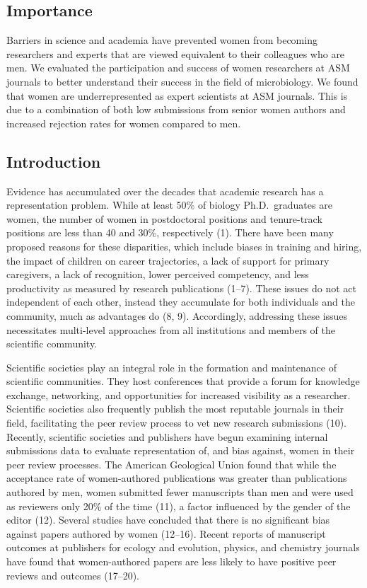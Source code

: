\documentclass[11pt,]{article}
\begin{document}
\subsection{Importance}\label{importance}

Barriers in science and academia have prevented women from becoming
researchers and experts that are viewed equivalent to their colleagues
who are men. We evaluated the participation and success of women
researchers at ASM journals to better understand their success in the
field of microbiology. We found that women are underrepresented as
expert scientists at ASM journals. This is due to a combination of both
low submissions from senior women authors and increased rejection rates
for women compared to men.

\subsection{Introduction}\label{introduction}

Evidence has accumulated over the decades that academic research has a
representation problem. While at least 50\% of biology Ph.D.~graduates
are women, the number of women in postdoctoral positions and
tenure-track positions are less than 40 and 30\%, respectively (1).
There have been many proposed reasons for these disparities, which
include biases in training and hiring, the impact of children on career
trajectories, a lack of support for primary caregivers, a lack of
recognition, lower perceived competency, and less productivity as
measured by research publications (1--7). These issues do not act
independent of each other, instead they accumulate for both individuals
and the community, much as advantages do (8, 9). Accordingly, addressing
these issues necessitates multi-level approaches from all institutions
and members of the scientific community.

Scientific societies play an integral role in the formation and
maintenance of scientific communities. They host conferences that
provide a forum for knowledge exchange, networking, and opportunities
for increased visibility as a researcher. Scientific societies also
frequently publish the most reputable journals in their field,
facilitating the peer review process to vet new research submissions
(10). Recently, scientific societies and publishers have begun examining
internal submissions data to evaluate representation of, and bias
against, women in their peer review processes. The American Geological
Union found that while the acceptance rate of women-authored
publications was greater than publications authored by men, women
submitted fewer manuscripts than men and were used as reviewers only
20\% of the time (11), a factor influenced by the gender of the editor
(12). Several studies have concluded that there is no significant bias
against papers authored by women (12--16). Recent reports of manuscript
outcomes at publishers for ecology and evolution, physics, and chemistry
journals have found that women-authored papers are less likely to have
positive peer reviews and outcomes (17--20).
\end{document}

